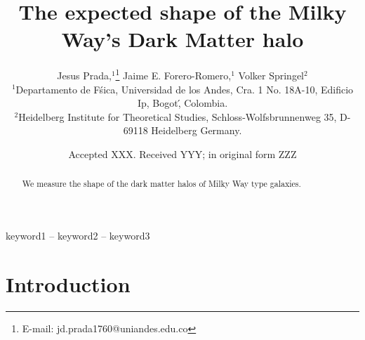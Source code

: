 \documentclass[a4paper,fleqn,usenatbib]{mnras}
\title[Title]{The expected shape of the Milky Way's Dark Matter halo}
\author[Jesus Prada,  Jaime E. Forero-Romero, Volker Springel ]{
Jesus Prada,$^{1}$\thanks{E-mail: jd.prada1760@uniandes.edu.co}
Jaime E. Forero-Romero,$^{1}$
Volker Springel$^{2}$
\\
$^{1}$Departamento de F\'sica, Universidad de los Andes, Cra. 1 No.
18A-10, Edificio Ip, Bogot\', Colombia.\\
$^{2}$Heidelberg Institute for Theoretical Studies, Schloss-Wolfsbrunnenweg 35, D-69118 Heidelberg
Germany.\\
}
\date{Accepted XXX. Received YYY; in original form ZZZ}
\begin{document}
\label{firstpage}
\pagerange{\pageref{firstpage}--\pageref{lastpage}}
\maketitle

\begin{abstract}
We measure the shape of the dark matter halos of Milky Way type galaxies.
\end{abstract}

\begin{keywords}
keyword1 -- keyword2 -- keyword3
\end{keywords}



\section{Introduction}


\citep{2011MNRAS.416.1377V}



\end{document}
